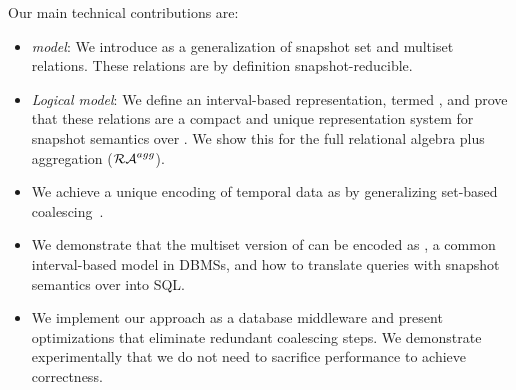 Our main technical contributions are: %
\begin{itemize}[noitemsep,topsep=0pt,parsep=0pt,partopsep=0pt]
\item \textit{ model}: We introduce \textit{\SKrels{}} as a generalization of snapshot
  set and multiset relations. These relations %
  are by definition
  snapshot-reducible. %


\item \textit{Logical model}: We define an interval-based representation, termed
  \emph{\periodKrels}, and prove that
  these relations are a compact and unique representation system for
  snapshot semantics over \SKrels{}.  We show this for the full
  relational algebra plus aggregation ($\mathcal{RA}^{agg}$).

\item
We achieve a unique encoding of temporal data as \periodKrels{} by  generalizing set-based  coalescing~\cite{DBLP:conf/vldb/BohlenSS96}.%

  \item We demonstrate that the multiset version of {\periodKrels} can be encoded as \textit{\SQLrels{}}, a
  common interval-based model in DBMSs, and how to translate queries with
  snapshot semantics over \periodKrels{} into SQL. %

\item We implement our approach as a database middleware and present
  optimizations that eliminate redundant coalescing steps. We demonstrate
  experimentally %
  that we do not
  need to sacrifice performance to achieve correctness.
\end{itemize}


